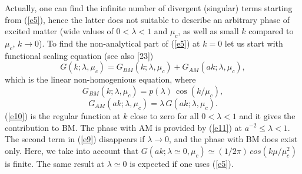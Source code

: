 \documentclass[WPCF,manyauthors]{wpcfTemplate}
\begin{document}
Actually, one can find the infinite number of divergent (singular) terms starting from (\ref{e5}), hence the latter does not suitable to describe an arbitrary phase of excited matter (wide values of $0 <\lambda  < 1$ and $\mu_{c}$, as well as small $k$ compared to $\mu_{c}$, $k\rightarrow 0$). To find the non-analytical part of (\ref{e5}) at $k =0$ let us start with functional scaling equation
(see also [23])
\begin{equation}
\label{e9}
G(k;\lambda, \mu_{c}) = G_{BM}(k;\lambda, \mu_{c}) + G_{AM}(ak;\lambda, \mu_{c}),
\end{equation}
which is the linear non-homogenious equation, where
\begin{equation}
\label{e10}
G_{BM}(k;\lambda, \mu_{c}) = p(\lambda)\,\cos(k/\mu_{c}),
\end{equation}
\begin{equation}
\label{e11}
G_{AM}(ak;\lambda, \mu_{c}) = \lambda\,G(ak;\lambda, \mu_{c}).
\end{equation}
(\ref{e10}) is the regular function at $k$ close to zero for all $0< \lambda < 1$ and it gives the contribution to BM. The phase with AM is provided by (\ref{e11}) at $ a^{-2} \leq \lambda < 1$. The second term in (\ref{e9}) disappears if $\lambda \rightarrow 0$, and the phase with BM does exist only. Here, we take into account that $ G(ak;\lambda \simeq 0, \mu_{c}) \simeq (1/2\pi)\, cos (k\mu/\mu^{2}_{c}) $ is finite. The same result at $\lambda \simeq 0$ is expected if one uses (\ref{e5}). 

\end{document}

